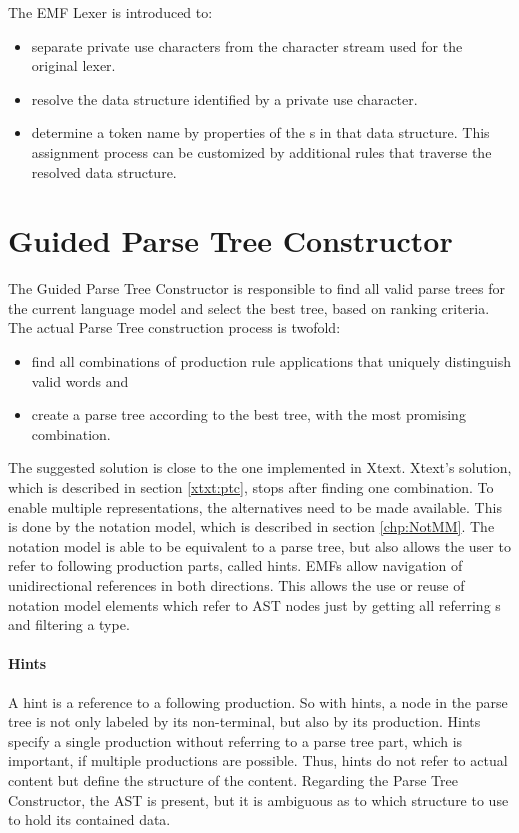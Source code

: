 The EMF Lexer is introduced to:
\begin{itemize}
	\item separate private use characters from the character stream used for the original lexer.
	\item resolve the data structure identified by a private use character.
	\item determine a token name by properties of the s in that data structure. This assignment process can be customized by additional rules that traverse the resolved data structure.
\end{itemize}



\section{Guided Parse Tree Constructor}
The Guided Parse Tree Constructor is responsible to find all valid parse trees for the current language model and select the best tree, based on ranking criteria. The actual Parse Tree construction process is twofold:
\begin{itemize}
	\item find all combinations of production rule applications that uniquely distinguish valid words and
	\item create a parse tree according to the best tree, with the most promising combination.
\end{itemize}
 
The suggested solution is close to the one implemented in Xtext. Xtext's solution, which is described in section \ref{xtxt:ptc}, stops after finding one combination. 
To enable multiple representations, the alternatives need to be made available. This is done by the notation model, which is described in section \ref{chp:NotMM}. The notation model is able to be equivalent to a parse tree, but also allows the user to refer to following production parts, called hints. EMFs  allow navigation of unidirectional references in both directions. This allows the use or reuse of notation model elements which refer to AST nodes just by getting all referring s and filtering a type.

\paragraph{Hints}
A hint is a reference to a following production. So with hints, a node in the parse tree is not only labeled by its non-terminal, but also by its production. Hints specify a single production without referring to a parse tree part, which is important, if multiple productions are possible. Thus, hints do not refer to actual content but define the structure of the content. Regarding the Parse Tree Constructor, the AST is present, but it is ambiguous as to which structure to use to hold its contained data.  

